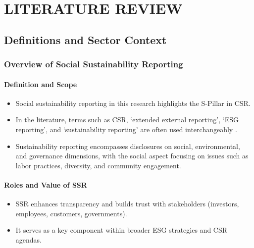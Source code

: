 \chapter{LITERATURE REVIEW}

\section{Definitions and Sector Context}

\subsection{Overview of Social Sustainability Reporting}

\subsubsection{Definition and Scope}
\begin{itemize}
    \item Social sustainability reporting in this research highlights the S-Pillar in CSR. 
    \item In the literature, terms such as CSR, ‘extended external reporting’, ‘ESG reporting’, and 
    ‘sustainability reporting’ are often used interchangeably \parencite{Edge2022, Fiechter2022}. 
    \item Sustainability reporting encompasses disclosures on social, environmental, and governance dimensions, 
    with the social aspect focusing on issues such as labor practices, diversity, and community engagement.
\end{itemize}

\subsubsection{Roles and Value of SSR}
\begin{itemize}
    \item SSR enhances transparency and builds trust with stakeholders (investors, employees, customers, governments). 
    \item It serves as a key component within broader ESG strategies and CSR agendas.
\end{itemize}

